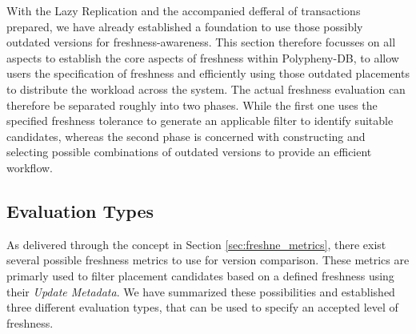 With the Lazy Replication and the accompanied defferal of transactions prepared, we have already established a foundation to use those possibly outdated versions
for freshness-awareness. This section therefore focusses on all aspects to establish the core aspects of freshness within Polypheny-DB,
to allow users the specification of freshness and efficiently using those outdated placements to distribute the workload across the system.
The actual freshness evaluation can therefore be separated roughly into two phases. While the first one uses the specified freshness tolerance to generate an 
applicable filter to identify suitable candidates, whereas the second phase is concerned with constructing and selecting possible combinations of outdated versions
to provide an efficient workflow.



\subsection{Evaluation Types}
\label{sec:eval_types}

As delivered through the concept in Section \ref{sec:freshne_metrics}, there exist several possible freshness metrics to use for version comparison.
These metrics are primarly used to filter placement candidates based on a defined freshness using their \emph{Update Metadata}.
We have summarized these possibilities and established three different evaluation types, that can be used to specify an accepted level of freshness.


